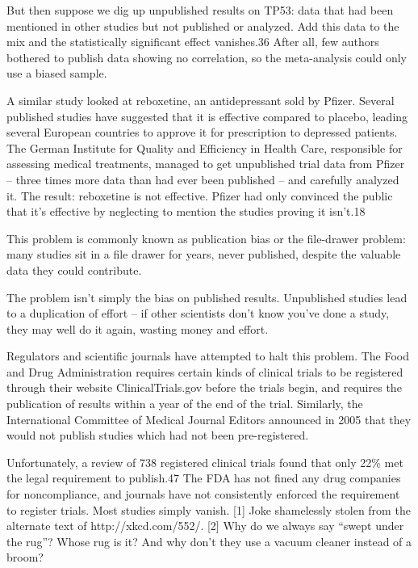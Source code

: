 But then suppose we dig up unpublished results on TP53: data that had been mentioned in other studies but not published or analyzed. Add this data to the mix and the statistically significant effect vanishes.36 After all, few authors bothered to publish data showing no correlation, so the meta-analysis could only use a biased sample.

A similar study looked at reboxetine, an antidepressant sold by Pfizer. Several published studies have suggested that it is effective compared to placebo, leading several European countries to approve it for prescription to depressed patients. The German Institute for Quality and Efficiency in Health Care, responsible for assessing medical treatments, managed to get unpublished trial data from Pfizer – three times more data than had ever been published – and carefully analyzed it. The result: reboxetine is not effective. Pfizer had only convinced the public that it’s effective by neglecting to mention the studies proving it isn’t.18

This problem is commonly known as publication bias or the file-drawer problem: many studies sit in a file drawer for years, never published, despite the valuable data they could contribute.

The problem isn’t simply the bias on published results. Unpublished studies lead to a duplication of effort – if other scientists don’t know you’ve done a study, they may well do it again, wasting money and effort.

Regulators and scientific journals have attempted to halt this problem. The Food and Drug Administration requires certain kinds of clinical trials to be registered through their website ClinicalTrials.gov before the trials begin, and requires the publication of results within a year of the end of the trial. Similarly, the International Committee of Medical Journal Editors announced in 2005 that they would not publish studies which had not been pre-registered.

Unfortunately, a review of 738 registered clinical trials found that only 22\% met the legal requirement to publish.47 The FDA has not fined any drug companies for noncompliance, and journals have not consistently enforced the requirement to register trials. Most studies simply vanish.
[1]	Joke shamelessly stolen from the alternate text of http://xkcd.com/552/.
[2]	Why do we always say “swept under the rug”? Whose rug is it? And why don’t they use a vacuum cleaner instead of a broom?